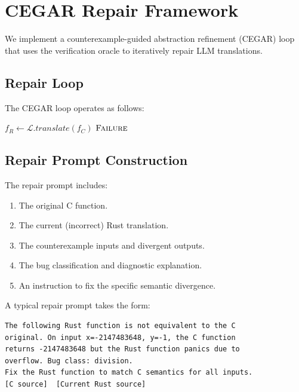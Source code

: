 \documentclass[10pt,letterpaper]{article}
\begin{document}
\section{CEGAR Repair Framework}
\label{sec:cegar}

We implement a counterexample-guided abstraction refinement (CEGAR) loop that uses
the verification oracle to iteratively repair LLM translations.

\subsection{Repair Loop}

The CEGAR loop operates as follows:

\begin{algorithm}[t]
\SetAlgoLined
{}
$f_R \leftarrow \mathcal{L}.\mathit{translate}(f_C)$\;
\Return $\textsc{Failure}$\;
\caption{CEGAR Repair Loop}
\label{alg:cegar}
\end{algorithm}

\subsection{Repair Prompt Construction}

The repair prompt includes:
\begin{enumerate}[itemsep=1pt]
\item The original C function.
\item The current (incorrect) Rust translation.
\item The counterexample inputs and divergent outputs.
\item The bug classification and diagnostic explanation.
\item An instruction to fix the specific semantic divergence.
\end{enumerate}

A typical repair prompt takes the form:

\begin{lstlisting}[language={},caption={Example repair prompt},label={lst:prompt}]
The following Rust function is not equivalent to the C
original. On input x=-2147483648, y=-1, the C function
returns -2147483648 but the Rust function panics due to
overflow. Bug class: division.
Fix the Rust function to match C semantics for all inputs.
[C source]  [Current Rust source]
\end{lstlisting}
\end{document}
